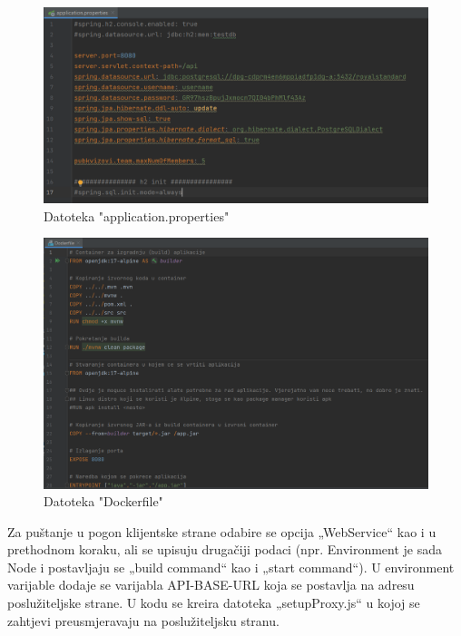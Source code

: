 		\begin{figure}[H]
			\includegraphics[width=\textwidth]{slike/applicationproperties.PNG} 
			\caption{Datoteka "application.properties"}
			\label{fig:application.properties}
		\end{figure}
		
		\begin{figure}[H]
			\includegraphics[width=\textwidth]{slike/dockerfile.PNG} 
			\caption{Datoteka "Dockerfile"}
			\label{fig:Dockerfile}
		\end{figure}
		
		Za puštanje u pogon klijentske strane odabire se opcija „WebService“ kao i u prethodnom koraku, ali se upisuju drugačiji podaci (npr. Environment je sada Node i postavljaju se „build command“ kao i „start command“). U environment varijable dodaje se varijabla API-BASE-URL koja se postavlja na adresu poslužiteljske strane. U kodu se kreira datoteka „setupProxy.js“ u kojoj se zahtjevi preusmjeravaju na poslužiteljsku stranu.
			
